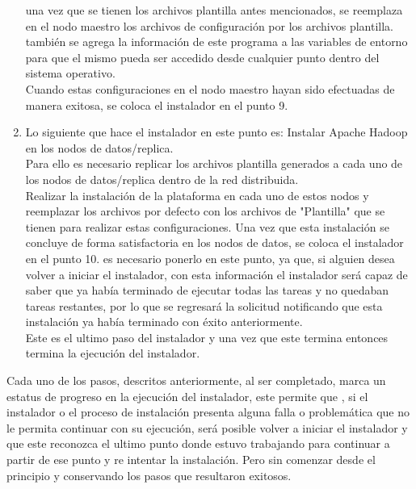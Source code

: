\begin{enumerate}
	una vez que se tienen los archivos plantilla antes mencionados, se reemplaza en el nodo maestro los archivos de configuración por los archivos plantilla.\\
	también se agrega la información de este programa a las variables de entorno para que el mismo pueda ser accedido desde cualquier punto dentro del sistema operativo.\\
	Cuando estas configuraciones en el nodo maestro hayan sido efectuadas de manera exitosa, se coloca el instalador en el punto 9.
	\item Lo siguiente que hace el instalador en este punto es: Instalar Apache Hadoop en los nodos de datos/replica.\\
	Para ello es necesario replicar los archivos plantilla generados a cada uno de los nodos de datos/replica dentro de la red distribuida.\\
	Realizar la instalación de la plataforma en cada uno de estos nodos y reemplazar los archivos por defecto con los archivos de "Plantilla" que se tienen para realizar estas configuraciones.
	Una vez que esta instalación se concluye de forma satisfactoria en los nodos de datos, se coloca el instalador en el punto 10.
	es necesario ponerlo en este punto, ya que, si alguien desea volver a iniciar el instalador, con esta información el instalador será capaz de saber que ya había terminado de ejecutar todas las tareas y no quedaban tareas restantes, por lo que se regresará la solicitud notificando que esta instalación ya había terminado con éxito anteriormente.\\
	Este es el ultimo paso del instalador y una vez que este termina entonces termina la ejecución del instalador.\\ 
\end{enumerate}
Cada uno de los pasos, descritos anteriormente, al ser completado, marca un estatus de progreso en la ejecución del instalador, este permite que , si el instalador o el proceso de instalación presenta alguna falla o problemática que no le permita continuar con su ejecución, será posible volver a iniciar el instalador y que este reconozca el ultimo punto donde estuvo trabajando para continuar a partir de ese punto y re intentar la instalación. Pero sin comenzar desde el principio y conservando los pasos que resultaron exitosos.
\\
  
